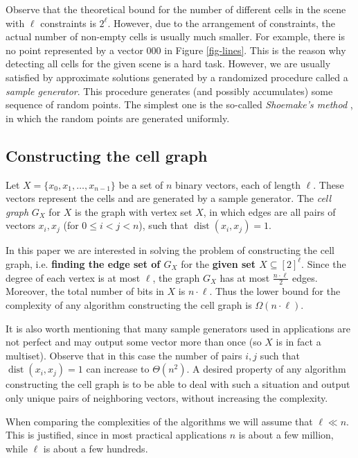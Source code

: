 \documentclass[a4paper]{article}
\DeclareMathOperator{\dist}{dist}
\begin{document}
Observe that the theoretical bound for the number of different cells in the scene with $\ell$ constraints is $2^\ell$. However, due to the arrangement of constraints, the actual number of non-empty cells is usually much smaller. For example, there is no point represented by a vector $000$ in Figure \ref{fig-lines}.
This is the reason why detecting all cells for the given scene is a hard task. However, we are usually satisfied by approximate solutions generated by a randomized procedure called a {\em sample generator}. This procedure generates (and possibly accumulates) some sequence of random points. The simplest one is the so-called {\em Shoemake's method} \cite{Shoemake:1992:URR:130745.130769}, in which the random points are generated uniformly.

\subsection{Constructing the cell graph}
Let $X = \{x_0,x_1,\ldots,x_{n-1}\}$ be a set of $n$ binary vectors, each of length $\ell$. These vectors represent the cells and are generated by a sample generator.
The {\em cell graph} $G_X$ for $X$ is the graph with vertex set $X$, in which edges are all pairs of vectors $x_i, x_j$ (for $0 \leq i < j < n$), such that $\dist(x_i,x_j) = 1$.

In this paper we are interested in solving the problem of constructing the cell graph, i.e. \textbf{finding the edge set of $G_X$} for the \textbf{given set $X \subseteq [2]^\ell$}.
Since the degree of each vertex is at most $\ell$, the graph $G_X$ has at most $\frac{n \cdot \ell}{2}$ edges. Moreover, the total number of bits in $X$ is $n \cdot \ell$.  Thus the lower bound for the complexity of any algorithm constructing the cell graph is $\Omega(n \cdot \ell)$.

It is also worth mentioning that many sample generators used in applications are not perfect and may output some vector more than once (so $X$ is in fact a multiset). Observe that in this case the number of pairs $i,j$ such that $\dist(x_i,x_j)=1$ can  increase to $\Theta(n^2)$.
A desired property of any algorithm constructing the cell graph is to be able to deal with such a situation and output only unique pairs of neighboring vectors, without increasing the complexity.

When comparing the complexities of the algorithms we will assume that $\ell \ll n$. This is justified, since in most practical applications $n$ is about a few million, while $\ell$ is about a few hundreds.
\end{document}
